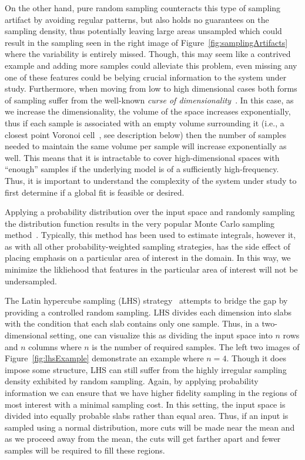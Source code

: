 On the other hand, pure random sampling counteracts this type of sampling artifact by avoiding regular patterns, but also holds no guarantees on the sampling density, thus potentially leaving large areas unsampled which could result in the sampling seen in the right image of Figure~\ref{fig:samplingArtifacts} where the variability is entirely missed.
%
Though, this may seem like a contrived example and adding more samples could alleviate this problem, even missing any one of these features could be belying crucial information to the system under study.
%
Furthermore, when moving from low to high dimensional cases both forms of sampling suffer from the well-known \emph{curse of dimensionality}~\cite{KeoghMueen2010}.
%
In this case, as we increase the dimensionality, the volume of the space increases exponentially, thus if each sample is associated with an empty volume surrounding it (i.e., a closest point Voronoi cell~\cite{deBergCheongKreveld2008}, see description below) then the number of samples needed to maintain the same volume per sample will increase exponentially as well.
%
This means that it is intractable to cover high-dimensional spaces with ``enough'' samples if the underlying model is of a sufficiently high-frequency.
%
Thus, it is important to understand the complexity of the system under study to first determine if a global fit is feasible or desired.

Applying a probability distribution over the input space and randomly sampling the distribution function results in the very popular Monte Carlo sampling method~\cite{MetropolisUlam1949}.
%
Typically, this method has been used to estimate integrals, however it, as with all other probability-weighted sampling strategies, has the side effect of placing emphasis on a particular area of interest in the domain.
%
In this way, we minimize the likliehood that features in the particular area of interest will not be undersampled.

The Latin hypercube sampling (LHS) strategy~\cite{McKayBeckmanConover1979,Tang1993,VanDam2008} attempts to bridge the gap by providing a controlled random sampling.
%
LHS divides each dimension into slabs with the condition that each slab contains only one sample.
%
Thus, in a two-dimensional setting, one can visualize this as dividing the input space into $n$ rows and $n$ columns where $n$ is the number of required samples.
%
The left two images of Figure~\ref{fig:lhsExample} demonstrate an example where $n=4$.
%
Though it does impose some structure, LHS can still suffer from the highly irregular sampling density exhibited by random sampling.
%
Again, by applying probability information we can ensure that we have higher fidelity sampling in the regions of most interest with a minimal sampling cost.
%
In this setting, the input space is divided into equally probable slabs rather than equal area.
%
Thus, if an input is sampled using a normal distribution, more cuts will be made near the mean and as we proceed away from the mean, the cuts will get farther apart and fewer samples will be required to fill these regions.

